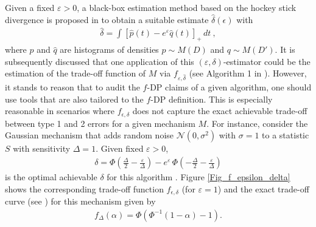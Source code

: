 Given a fixed $\varepsilon >0$, a black-box estimation method based on the hockey stick divergence is proposed in \cite{Koskela2024} to obtain a suitable estimate $\hat{\delta}(\epsilon)$ with 
\begin{align*}
  \hat{\delta} = \int \left[ \hat{p}(t) - e^{\varepsilon} \hat{q}(t) \right]_+  \, dt ~,
\end{align*}
where $\hat{p}$ and $\hat{q}$ are histograms of densities $p \sim M(D)$ and $q \sim M(D')$. 
It is subsequently discussed that one application of this $(\varepsilon, \delta)$-estimator could be the estimation of the trade-off function of $M$ via $f_{\varepsilon,\hat{\delta}}$ (see Algorithm 1 in \cite{Koskela2024}). However, it stands to reason that to audit the $f$-DP claims of a given algorithm, one should use tools that are also tailored to the $f$-DP definition. %
This is especially reasonable in scenarios where $f_{\epsilon,\delta} $ does not capture the exact achievable trade-off between type 1 and 2 errors for a given mechanism $M$. 
For instance, consider the Gaussian mechanism that adds random noise $\mathcal{N}(0, \sigma^2)$ with $\sigma = 1$ to a statistic $S$ with sensitivity $\Delta = 1$. Given fixed $\varepsilon > 0$, 
\begin{align*}
    \delta = \Phi \left( \frac{\Delta}{2} - \frac{\varepsilon}{\Delta}  \right) - e^{\varepsilon} \, \Phi \left( - \frac{\Delta}{2} - \frac{\varepsilon}{\Delta}  \right) 
\end{align*}
is the optimal achievable $\delta$ for this algorithm \cite{Balle2018}. Figure \ref{Fig_f_epsilon_delta} shows the corresponding trade-off function $f_{\epsilon,\delta}$ (for $\varepsilon = 1$) and the exact trade-off curve (see \cite{Dong2022}) for this mechanism given by 
\begin{align*}
    f_{\Delta}(\alpha) = \Phi(\Phi^{-1}(1 - \alpha) - 1).
\end{align*}



